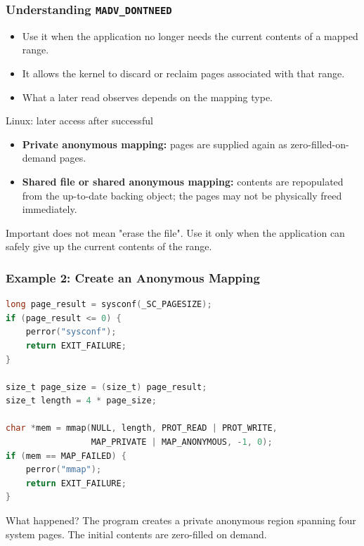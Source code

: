 \documentclass[10pt,hyperref={bookmarks=false},aspectratio=169,usenames,dvipsnames,hideothersubsections]{beamer}
\newcommand{\code}[1]{\texttt{\detokenize{#1}}}
\begin{document}
\begin{frame}
\frametitle{Understanding \texttt{MADV\_DONTNEED}}
\begin{itemize}
  \item Use it when the application no longer needs the current contents of a mapped range.
  \item It allows the kernel to discard or reclaim pages associated with that range.
  \item What a later read observes depends on the mapping type.
\end{itemize}
\begin{block}{Linux: later access after successful \code{MADV_DONTNEED}}
  \begin{itemize}
    \item \textbf{Private anonymous mapping:} pages are supplied again as zero-filled-on-demand pages.
    \item \textbf{Shared file or shared anonymous mapping:} contents are repopulated from the up-to-date backing object; the pages may not be physically freed immediately.
  \end{itemize}
\end{block}
\begin{alertblock}{Important}
\code{MADV_DONTNEED} does not mean "erase the file". Use it only when the application can safely give up the current contents of the range.
\end{alertblock}
\end{frame}

\begin{frame}[fragile]
\frametitle{Example 2: Create an Anonymous Mapping}
\begin{lstlisting}[language=C,basicstyle=\ttfamily\footnotesize]
long page_result = sysconf(_SC_PAGESIZE);
if (page_result <= 0) {
    perror("sysconf");
    return EXIT_FAILURE;
}

size_t page_size = (size_t) page_result;
size_t length = 4 * page_size;

char *mem = mmap(NULL, length, PROT_READ | PROT_WRITE,
                 MAP_PRIVATE | MAP_ANONYMOUS, -1, 0);
if (mem == MAP_FAILED) {
    perror("mmap");
    return EXIT_FAILURE;
}
\end{lstlisting}
\begin{block}{What happened?}
The program creates a private anonymous region spanning four system pages. The initial contents are zero-filled on demand.
\end{block}
\end{frame}
\end{document}
